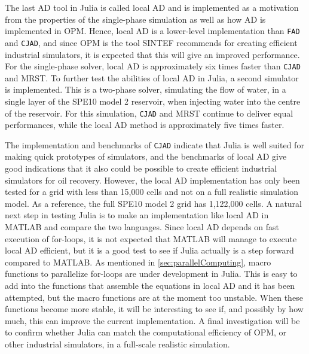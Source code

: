The last AD tool in Julia is called local AD and is implemented as a motivation from the properties of the single-phase simulation as well as how AD is implemented in OPM. Hence, local AD is a lower-level implementation than \texttt{FAD} and \texttt{CJAD}, and since OPM is the tool SINTEF recommends for creating efficient industrial simulators, it is expected that this will give an improved performance. For the single-phase solver, local AD is approximately six times faster than \texttt{CJAD} and MRST. To further test the abilities of local AD in Julia, a second simulator is implemented. This is a two-phase solver, simulating the flow of water, in a single layer of the SPE10 model 2 reservoir, when injecting water into the centre of the reservoir. For this simulation, \texttt{CJAD} and MRST continue to deliver equal performances, while the local AD method is approximately five times faster.

The implementation and benchmarks of \texttt{CJAD} indicate that Julia is well suited for making quick prototypes of simulators, and the benchmarks of local AD give good indications that it also could be possible to create efficient industrial simulators for oil recovery. However, the local AD implementation has only been tested for a grid with less than 15,000 cells and not on a full realistic simulation model. As a reference, the full SPE10 model 2 grid has 1,122,000 cells. A natural next step in testing Julia is to make an implementation like local AD in MATLAB and compare the two languages. Since local AD depends on fast execution of for-loops, it is not expected that MATLAB will manage to execute local AD efficient, but it is a good test to see if Julia actually is a step forward compared to MATLAB. As mentioned in \autoref{sec:parallelComputing}, macro functions to parallelize for-loops are under development in Julia. This is easy to add into the functions that assemble the equations in local AD and it has been attempted, but the macro functions are at the moment too unstable. When these functions become more stable, it will be interesting to see if, and possibly by how much, this can improve the current implementation. A final investigation will be to confirm whether Julia can match the computational efficiency of OPM, or other industrial simulators, in a full-scale realistic simulation. 

